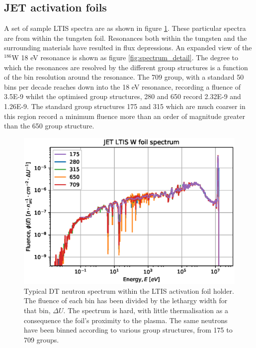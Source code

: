 \subsection{JET activation foils}

A set of sample LTIS spectra are as shown in figure \ref{fig:spectrum}. These particular spectra are from within the tungsten foil. Resonances both within the tungsten and the surrounding materials have resulted in flux depressions. An expanded view of the $^{186}$W 18 eV resonance is shown as figure \ref{fig:spectrum_detail}. The degree to which the resonances are resolved by the different group structures is a function of the bin resolution around the resonance. The 709 group, with a standard 50 bins per decade reaches down into the 18 eV resonance, recording a fluence of 3.5E-9 whilst the optimised group structures, 280 and 650 record 2.32E-9 and 1.26E-9. The standard group structures 175 and 315 which are much coarser in this region record a minimum fluence more than an order of magnitude greater than the 650 group structure.

\begin{figure}[H]
  \centering
  \includegraphics[width=\linewidth]{W186_spectra_diff_groups.eps}
  \caption{Typical DT neutron spectrum within the LTIS activation foil holder. The fluence of each bin has been divided by the lethargy width for that bin, $\Delta U$. The spectrum is hard, with little thermalisation as a consequence the foil's proximity to the plasma. The same neutrons have been binned according to various group structures, from 175 to 709 groups.}
  \label{fig:spectrum}
\end{figure}

